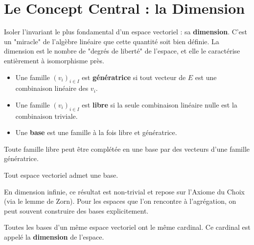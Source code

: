 \section{Le Concept Central : la Dimension}

\begin{objectif}
    Isoler l'invariant le plus fondamental d'un espace vectoriel : sa \textbf{dimension}. C'est un "miracle" de l'algèbre linéaire que cette quantité soit bien définie. La dimension est le nombre de "degrés de liberté" de l'espace, et elle le caractérise entièrement à isomorphisme près.
\end{objectif}

\begin{definition}
    \begin{itemize}
        \item Une famille $(v_i)_{i \in I}$ est \textbf{génératrice} si tout vecteur de $E$ est une combinaison linéaire des $v_i$.
        \item Une famille $(v_i)_{i \in I}$ est \textbf{libre} si la seule combinaison linéaire nulle est la combinaison triviale.
        \item Une \textbf{base} est une famille à la fois libre et génératrice.
    \end{itemize}
\end{definition}

\begin{theorem}
    Toute famille libre peut être complétée en une base par des vecteurs d'une famille génératrice.
\end{theorem}

\begin{corollary}
    Tout espace vectoriel admet une base.
\end{corollary}
\begin{remark}
    En dimension infinie, ce résultat est non-trivial et repose sur l'Axiome du Choix (via le lemme de Zorn). Pour les espaces que l'on rencontre à l'agrégation, on peut souvent construire des bases explicitement.
\end{remark}

\begin{theorem}
    Toutes les bases d'un même espace vectoriel ont le même cardinal. Ce cardinal est appelé la \textbf{dimension} de l'espace.
\end{theorem}

